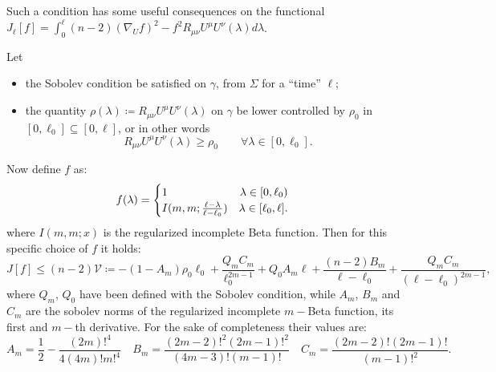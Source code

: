 Such a condition has some useful consequences on the functional \(J_{\ell}[f] = \int_0^{\ell} (n - 2)(\nabla_Uf)^2 - f^2R_{\mu\nu}U^{\mu}U^{\nu}(\lambda) d\lambda \).
\begin{lemma}
	\label{lemma:J-sobolev-condition}
	Let 
	\begin{itemize}
		\item[\ding{99}] the Sobolev condition be satisfied on \(\gamma\), from \(\Sigma\) for a ``time'' \(\ell\);
 		 \item[\ding{99}] the quantity \(\rho(\lambda) \coloneqq R_{\mu\nu}U^{\mu}U^{\nu}(\lambda) \) on \(\gamma\) be lower controlled by \(\rho_0\) in \([0, \ell_0] \subseteq [0, \ell]\), or in other words
    	 \[
			R_{\mu\nu}U^{\mu}U^{\nu}(\lambda) \ge \rho_0 \quad\quad \forall\lambda\in [0, \ell_0].
		\]
	\end{itemize}
	Now define \(f\) as:
	\begin{equation}
		f(\lambda) = 
		\begin{cases}
			1 \hfill \lambda\in [0, \ell_0) \\
			I(m, m; \frac{\ell - \lambda}{\ell - \ell_0}) \quad \hfill \lambda\in [\ell_0, \ell].
		\end{cases}
	\end{equation}
	where \(I(m,m;x)\) is the regularized incomplete Beta function.
	Then for this specific choice of \(f\) it holds:
	\begin{equation}
		\label{eq:J-sobolev-condition}
		J[f] \le (n - 2)\mathcal{V} \coloneqq -(1-A_m)\rho_0\ell_0 + \frac{Q_mC_m}{\ell_0^{2m-1}} + Q_0A_m\ell + \frac{(n - 2)B_m}{\ell - \ell_0} + \frac{Q_mC_m}{(\ell-\ell_0)^{2m-1}},
	\end{equation}
	where \(Q_m\), \(Q_0\) have been defined with the Sobolev condition, while \(A_m\), \(B_m\) and \(C_m\) are the sobolev norms of the regularized incomplete \(m-\)Beta function, its first and \(m-\)th derivative. For the sake of completeness their values are:
	\[
	A_m = \frac{1}{2} - \frac{(2m)!^4}{4(4m)!m!^4} \quad 
	B_m= \frac{(2m-2)!^2(2m-1)!^2}{(4m-3)!(m - 1)!} \quad 
	C_m = \frac{(2m-2)!(2m-1)!}{(m-1)!^2}. 
	\]
\end{lemma}

